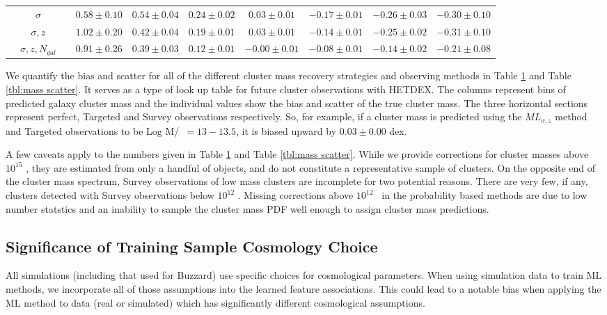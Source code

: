 \documentclass[fleqn,usenatbib]{mnras}
\begin{document}
\begin{table}
\begin{tabular}{cccccccccc}
		&$\sigma$ & \nd & $0.58\pm{0.10}$ & $0.54\pm{0.04}$ & $0.24\pm{0.02}$ & $0.03\pm{0.01}$ & $-0.17\pm{0.01}$ & $-0.26\pm{0.03}$ & $-0.30\pm{0.10}$ \\
		&$\sigma, z$ & \nd & $1.02\pm{0.20}$ & $0.42\pm{0.04}$ & $0.19\pm{0.01}$ & $0.03\pm{0.01}$ & $-0.14\pm{0.01}$ & $-0.25\pm{0.02}$ & $-0.31\pm{0.10}$ \\
		&$\sigma, z, N_{gal}$ & \nd & $0.91\pm{0.26}$ & $0.39\pm{0.03}$ & $0.12\pm{0.01}$ & $-0.00\pm{0.01}$ & $-0.08\pm{0.01}$ & $-0.14\pm{0.02}$ & $-0.21\pm{0.08}$ \\
	\hline
	\end{tabular}
\label{tbl:mass bias}
\end{table}

We quantify the bias and scatter for all of the different cluster mass recovery strategies and observing methods in Table \ref{tbl:mass bias} and Table \ref{tbl:mass scatter}. It serves as a type of look up table for future cluster observations with HETDEX. The columns represent bins of predicted galaxy cluster mass and the individual values show the bias and scatter of the true cluster mass. The three horizontal sections represent perfect, Targeted and Survey observations respectively. So, for example, if a cluster mass is predicted using the $ML_{\sigma, z}$ method and Targeted observations to be Log M/\Msol\ $=13-13.5$, it is biased upward by $0.03\pm{0.00}$ dex. 

 A few caveats apply to the numbers given in Table \ref{tbl:mass bias} and Table \ref{tbl:mass scatter}. While we provide corrections for cluster masses above $10^{15}$ \msol, they are estimated from only a handful of objects, and do not constitute a representative sample of clusters. On the opposite end of the cluster mass spectrum, Survey observations of low mass clusters are incomplete for two potential reasons. There are very few, if any, clusters detected with Survey observations below $10^{12}$ \msol. Missing corrections above $10^{12}$ \msol\ in the probability based methods are due to low number statstics and an inability to sample the cluster mass PDF well enough to assign cluster mass predictions.
 
\subsection{Significance of Training Sample Cosmology Choice}
All simulations (including that used for Buzzard) use specific choices for cosmological parameters. When using simulation data to train ML methods, we incorporate all of those assumptions into the learned feature associations. This could lead to a notable bias when applying the ML method to data (real or simulated) which has significantly different cosmological assumptions.
\end{document}
